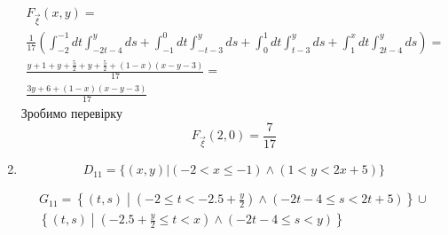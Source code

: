 \documentclass{article}
\begin{document}
\begin{enumerate}
\begin{center}
	\end{center}
	\[
	\begin{gathered}
		F_{\overrightarrow{\xi}} (x, y) = \\ \frac{1}{17}\left(\int_{-2}^{-1}dt\int_{-2t-4}^{y} ds +  \int_{-1}^{0}dt\int_{-t-3}^{y} ds + \int_{0}^{1}dt\int_{t-3}^{y} ds + \int_{1}^{x}dt\int_{2t-4}^{y} ds\right) = \\
		\frac{y + 1 + y + \frac{5}{2} + y + \frac{5}{2} + (1 - x) (x - y - 3)}{17} = \\
		\frac{3y + 6 + (1 - x) (x - y - 3)}{17}
	\end{gathered}
	\]
	Зробимо перевірку 
	\[
	F_{\overrightarrow{\xi}} (2, 0) = \frac{7}{17}
	\]
	\newpage
	\item
	
	\[
	D_{11} = \{(x, y) \vert (-2 < x \leq -1) \wedge (1 < y < 2x+5)\} 
	\]
	
	\[
	\begin{gathered}
		G_{11} = \left\{ (t, s) \middle\vert (-2 \leq t < -2.5 + \frac{y}{2}) \wedge ( -2t-4 \leq s < 2t+5) \right\} \cup \\ \left\{ (t, s) \middle\vert (-2.5 + \frac{y}{2} \leq t < x) \wedge ( -2t-4 \leq s < y) \right\} 
	\end{gathered}
	\]
	

\end{enumerate}
\end{document}

